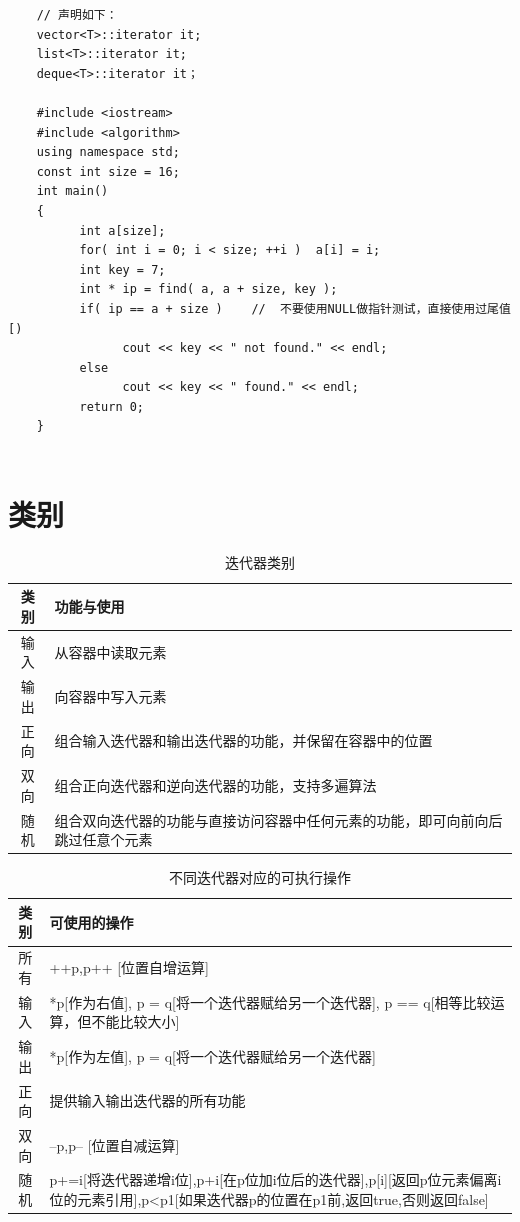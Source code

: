 \documentclass[UTF8,a4paper,12pt]{ctexbook}
\begin{document}
		\begin{lstlisting}
	// 声明如下：
	vector<T>::iterator it;
	list<T>::iterator it;
	deque<T>::iterator it；
	
	#include <iostream>
	#include <algorithm>
	using namespace std;
	const int size = 16;
	int main()
	{
		  int a[size];
		  for( int i = 0; i < size; ++i )  a[i] = i;
		  int key = 7;
		  int * ip = find( a, a + size, key );
		  if( ip == a + size )    //  不要使用NULL做指针测试，直接使用过尾值 [)
			    cout << key << " not found." << endl;
		  else
			    cout << key << " found." << endl;
		  return 0;
	}
	
		\end{lstlisting}
		
	\section{类别}
		\begin{table}[H]
			\centering
			\caption{迭代器类别}
			\begin{tabular}{c|m{15cm}}
				\hline 
				类别 & 功能与使用\\
				\hline
				输入	& 从容器中读取元素\\
				输出  & 向容器中写入元素\\
				正向  & 组合输入迭代器和输出迭代器的功能，并保留在容器中的位置\\
				双向  & 组合正向迭代器和逆向迭代器的功能，支持多遍算法\\
				随机  & 组合双向迭代器的功能与直接访问容器中任何元素的功能，即可向前向后跳过任意个元素\\
				\hline
				\end{tabular}
			\end{table}	
			
			\begin{table}[h]
				\centering
				\caption{不同迭代器对应的可执行操作}
				\begin{tabular}{c|m{15cm}}
					\hline 
					类别 & 可使用的操作\\
					\hline
					所有  & ++p,p++ [位置自增运算]\\
					\hline
					输入  & *p[作为右值], p = q[将一个迭代器赋给另一个迭代器], p == q[相等比较运算，但不能比较大小]\\
					\hline
					输出  & *p[作为左值], p = q[将一个迭代器赋给另一个迭代器]\\
					\hline
					正向  & 提供输入输出迭代器的所有功能\\
					\hline
					双向  & --p,p-- [位置自减运算]\\
					\hline
					随机  & p+=i[将迭代器递增i位],p+i[在p位加i位后的迭代器],p[i][返回p位元素偏离i位的元素引用],p<p1[如果迭代器p的位置在p1前,返回true,否则返回false]\\
					\hline
				\end{tabular}
			\end{table}
			
\end{document}
